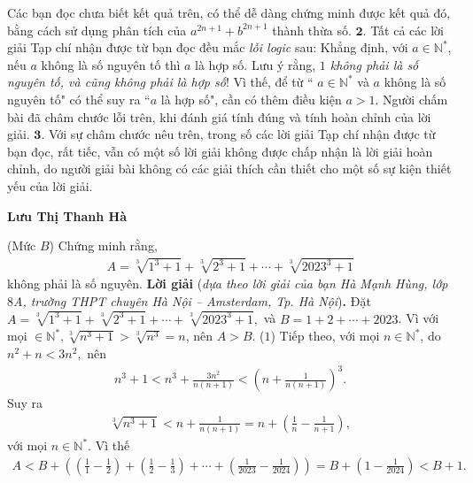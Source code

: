 \begin{multicols}{2}
	\vskip 0.05cm
	Các bạn đọc chưa biết kết quả trên, có thể dễ dàng chứng minh được kết quả đó, bằng cách sử dụng phân tích của ${a^{2n + 1}} + {b^{2n + 1}}$ thành thừa số.
	\vskip 0.05cm
	$\pmb{2.}$ Tất cả các lời giải Tạp chí nhận được từ bạn đọc đều mắc \textit{lỗi logic} sau: Khẳng định, với $a \in \mathbb{N^*}$, nếu $a$ không là số nguyên tố thì $a$ là hợp số.
	\vskip 0.05cm
	Lưu ý rằng, \textit{$1$ không phải là số nguyên tố, và cũng không phải là hợp số}! Vì thế, để từ `` $a \in \mathbb{N^*}$  và $a$ không là số nguyên tố" có thể suy ra ``$a$ là hợp số", cần có thêm điều kiện $a > 1$.
	\vskip 0.05cm
	Người chấm bài đã châm chước lỗi trên, khi đánh giá tính đúng và tính hoàn chỉnh của lời giải.
	\vskip 0.05cm
	$\pmb{3.}$ Với sự châm chước nêu trên, trong số các lời giải Tạp chí nhận được từ bạn đọc, rất tiếc, vẫn có một số lời giải không được chấp nhận là lời giải hoàn chỉnh, do người giải bài không có các giải thích cần thiết cho một số sự kiện thiết yếu của lời giải.
	\begin{flushright}
		\textbf{Lưu Thị Thanh Hà}
	\end{flushright}
	{}
	(Mức $B$) Chứng minh rằng,
	\begin{align*}
		A=\sqrt[3]{1^3+1}+\sqrt[3]{2^3+1}+\cdots+\sqrt[3]{2023^3+1}
	\end{align*}
	không phải là số nguyên.
	\textbf{Lời giải} (\textit{dựa theo lời giải của bạn Hà Mạnh Hùng, lớp $8$A, trường THPT chuyên Hà Nội -- Amsterdam, Tp. Hà Nội})\textbf{.}
	\vskip 0.05cm
	Đặt $A = \sqrt[3]{{{1^3} + 1}} + \sqrt[3]{{{2^3} + 1}} +  \cdots  + \sqrt[3]{{{{2023}^3} + 1}},$  và $B = 1 + 2 +  \cdots  + 2023$.
	\vskip 0.05cm 
	Vì với mọi  $ \in \mathbb{N^*}, \sqrt[3]{{{n^3} + 1}} > \sqrt[3]{{{n^3}}} = n$, nên $A > B$. \hfill ($1$)
	\vskip 0.05cm      
	Tiếp theo, với mọi $n \in \mathbb{N^*}$, do ${n^2} + n < 3{n^2},$  nên
	\begin{align*}
		{n^3} + 1 < {n^3} + \frac{{3{n^2}}}{{n\left( {n + 1} \right)}} < {\left( {n + \frac{1}{{n\left( {n + 1} \right)}}} \right)^3}.
	\end{align*}
	Suy ra
	\begin{align*}
		\sqrt[3]{{{n^3} + 1}} < n + \frac{1}{{n\left( {n + 1} \right)}} = n + \left( {\frac{1}{n} - \frac{1}{{n + 1}}} \right),
	\end{align*}
	với mọi $n \in \mathbb{N^*}$.
	\vskip 0.05cm  
	Vì thế
	\begin{align*}
		A < B + \left( {\left( {\frac{1}{1} - \frac{1}{2}} \right) + \left( {\frac{1}{2} - \frac{1}{3}} \right) +  \cdots  + \left( {\frac{1}{{2023}} - \frac{1}{{2024}}} \right)} \right) = B + \left( {1 - \frac{1}{{2024}}} \right) < B + 1. \tag{$2$}

\end{align*}
\end{multicols}
